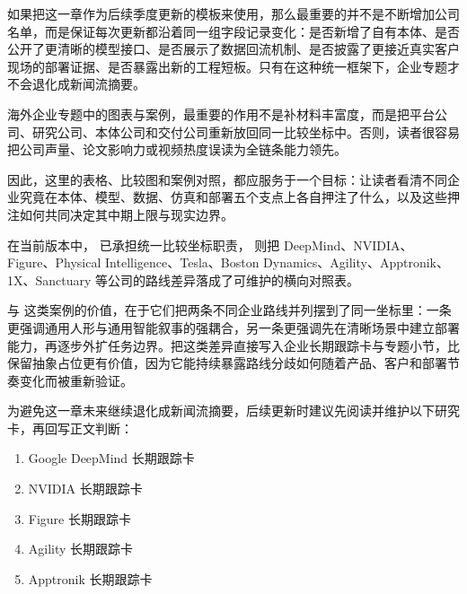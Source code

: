 如果把这一章作为后续季度更新的模板来使用，那么最重要的并不是不断增加公司名单，而是保证每次更新都沿着同一组字段记录变化：是否新增了自有本体、是否公开了更清晰的模型接口、是否展示了数据回流机制、是否披露了更接近真实客户现场的部署证据、是否暴露出新的工程短板。只有在这种统一框架下，企业专题才不会退化成新闻流摘要。

海外企业专题中的图表与案例，最重要的作用不是补材料丰富度，而是把平台公司、研究公司、本体公司和交付公司重新放回同一比较坐标中。否则，读者很容易把公司声量、论文影响力或视频热度误读为全链条能力领先。

因此，这里的表格、比较图和案例对照，都应服务于一个目标：让读者看清不同企业究竟在本体、模型、数据、仿真和部署五个支点上各自押注了什么，以及这些押注如何共同决定其中期上限与现实边界。

在当前版本中，\texttt{} 已承担统一比较坐标职责，\texttt{} 则把 DeepMind、NVIDIA、Figure、Physical Intelligence、Tesla、Boston Dynamics、Agility、Apptronik、1X、Sanctuary 等公司的路线差异落成了可维护的横向对照表。

\texttt{} 与 \texttt{} 这类案例的价值，在于它们把两条不同企业路线并列摆到了同一坐标里：一条更强调通用人形与通用智能叙事的强耦合，另一条更强调先在清晰场景中建立部署能力，再逐步外扩任务边界。把这类差异直接写入企业长期跟踪卡与专题小节，比保留抽象占位更有价值，因为它能持续暴露路线分歧如何随着产品、客户和部署节奏变化而被重新验证。

为避免这一章未来继续退化成新闻流摘要，后续更新时建议先阅读并维护以下研究卡，再回写正文判断：

\begin{enumerate}
\item Google DeepMind 长期跟踪卡
\item NVIDIA 长期跟踪卡
\item Figure 长期跟踪卡
\item Agility 长期跟踪卡
\item Apptronik 长期跟踪卡
\end{enumerate}
